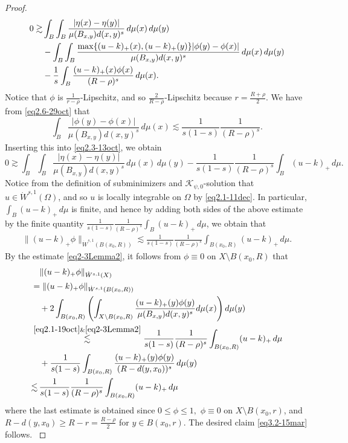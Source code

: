 \documentclass[11pt,leqno]{amsart}
\numberwithin{equation}{section}
\theoremstyle{definition}
\begin{document}
\begin{proof}
{\begin{align}
				0\gtrsim&  \int_B\int_B \frac{|\eta(x)-\eta(y)| }{\mu(B_{x,y}) d(x,y)^s}  \,d\mu(x)\,d\mu(y) \notag \\ \notag
				&-   \int_B\int_B \frac{\max\{(u-k)_+(x), (u-k)_+(y) \} |\phi(y)-\phi(x)|}{\mu(B_{x,y}) d(x,y)^s}  \,d\mu(x)\,d\mu(y)
				\\ & - \frac{1}{s} \int_{B} \frac{ (u-k)_+(x)\phi(x) }{(R-\rho)^s}\,d\mu(x).\label{eq2.3-13oct}
			\end{align}
		}
		Notice that $\phi$ is $\frac{1}{r-\rho}$-Lipschitz, and so $\frac{2}{R-\rho}$-Lipschitz because $r=\frac{R+\rho}{2}$. We have from \eqref{eq2.6-29oct} that
		\[
		\int_{B}  \frac{  |\phi(y)-\phi(x)|}{\mu(B_{x,y}) d(x,y)^s}  \,d\mu(x)
		\lesssim \frac{1}{s(1-s)}\frac{1}{(R-\rho)^s}.
		\]
		Inserting this into \eqref{eq2.3-13oct}, we obtain 
		{
			\[
			0\gtrsim   \int_B\int_B \frac{|\eta(x)-\eta(y)| }{\mu(B_{x,y}) d(x,y)^s}  \,d\mu(x)\,d\mu(y) - \frac{1}{s(1-s)}\frac{1}{(R-\rho)^s}\int_{B} (u-k)_+\, d\mu.
			\]
			Notice from the definition of subminimizers and $\mathcal K_{\psi,0}$-solution that $u\in \dot W^{s,1}(\Omega)$, and so $u$ is locally integrable on $\Omega$ by \eqref{eq2.1-11dec}. In particular, $\int_{B} (u-k)_+\, d\mu$ is finite, and hence by adding both sides of the above estimate  by the finite quantity $ \frac{1}{s(1-s)}
			\frac{1}{(R-\rho)^s}
			\int_{B} (u-k)_+\, d\mu$, 
			we obtain that
			\begin{align}
				\|(u-k)_+\phi\|_{\dot W^{s,1}(B(x_0,R))}
				\lesssim
				\frac{1}{s(1-s)}
				\frac{1}{(R-\rho)^s}
				\int_{B(x_0,R)} (u-k)_+\, d\mu.
				\label{eq2.1-19oct}
			\end{align}
			By the estimate  \eqref{eq2-3Lemma2}, it follows from $\phi\equiv 0$ on $X\setminus B(x_0,R)$ that
			\begin{align*}
				&\quad \|(u-k)_+\phi\|_{\dot W^{s,1}(X)}\\
				&= \|(u-k)_+\phi\|_{\dot W^{s,1}(B(x_0,R))} \\
				&\quad + 2 \int_{B(x_0,R)} \left( \int_{X\setminus B(x_0,R)} \frac{(u-k)_+(y)\phi(y)}{\mu(B_{x,y})d(x,y)^s}d\mu(x) \right)d\mu(y)\\
				&\overset{\eqref{eq2.1-19oct} \&  \eqref{eq2-3Lemma2}}{\lesssim} \frac{1}{s(1-s)}\frac{1}{(R-\rho)^s}\int_{B(x_0,R)} (u-k)_+\, d\mu\\
				&\quad + \frac{1}{s(1-s)}\int_{B(x_0,R)}  \frac{(u-k)_+(y)\phi(y)}{{( R- d(y,x_0))^s}}\, d\mu(y)\\
				& {\lesssim} \, \frac{1}{s(1-s)}\frac{1}{(R-\rho)^s}\int_{B(x_0,R)} (u-k)_+\, d\mu
			\end{align*}
			where the last estimate is obtained since $0\leq \phi\leq 1,$  $\phi\equiv  0$ on $ X\setminus B(x_0,r)$, and  $R-d(y,x_0)\geq R-r=\frac{R-\rho}{2}$ for $y\in B(x_0,r)$. The desired claim \eqref{eq3.2-15mar}  follows.
		}
	\end{proof}
	
\end{document}
